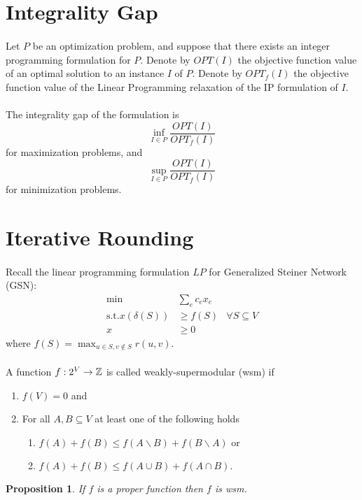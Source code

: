 \documentclass[letterpaper,12pt,oneside,onecolumn]{article}
\newtheorem{proposition}[fact]{Proposition}
\begin{document}
\section*{Integrality Gap}
\paragraph{}
Let $P$ be an optimization problem, and suppose that there exists an integer programming formulation for $P$. Denote by $OPT(I)$ the objective function value of an optimal solution to an instance $I$ of $P$. Denote by $OPT_f(I)$ the objective function value of the Linear Programming relaxation of the IP formulation of $I$.
\paragraph{}
The integrality gap of the formulation is
$$\inf_{I \in P} \frac{OPT(I)}{OPT_f(I)}$$
for maximization problems, and
$$\sup_{I \in P} \frac{OPT(I)}{OPT_f(I)}$$
for minimization problems.
\section{Iterative Rounding}
\paragraph{}  Recall the linear programming formulation $LP$ for Generalized Steiner Network (GSN):
\begin{align*}
\min &\sum_e c_e x_e \\
\text{s.t.} x(\delta(S)) &\geq f(S) &\forall S \subseteq V\\
x&\geq 0
\end{align*}
where $f(S) = \max_{u \in S, v \not\in S} r(u,v).$
\paragraph{}
A function $f: 2^V \rightarrow \mathbb{Z}$ is called weakly-supermodular (wsm) if
\begin{enumerate}
\item $f(V) = 0$ and
\item For all $A,B \subseteq V$ at least one of the following holds
\begin{enumerate}
\item $f(A) + f(B) \leq f(A\backslash B) + f(B \backslash A)$ or
\item $f(A) + f(B) \leq f(A\cup B) + f(A\cap B).$
\end{enumerate}
\end{enumerate}
\begin{proposition}
If $f$ is a proper function then $f$ is wsm.
\end{proposition}
\end{document}
